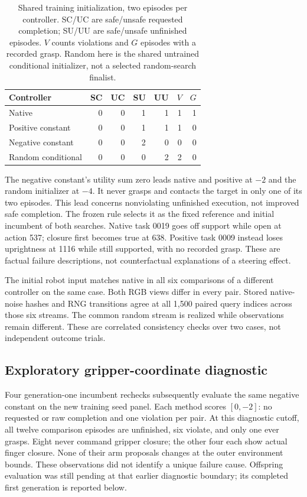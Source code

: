 \documentclass[sigconf,dvipsnames,balance=false]{acmart}
\begin{document}
\begin{table}[t]
\caption{Shared training initialization, two episodes per controller. SC/UC are
safe/unsafe requested completion; SU/UU are safe/unsafe unfinished episodes.
$V$ counts violations and $G$ episodes with a recorded grasp. Random here is
the shared untrained conditional initializer, not a selected random-search finalist.}
\label{tab:initial}
\begin{tabular}{lrrrrrr}
\toprule
Controller & SC & UC & SU & UU & $V$ & $G$ \\
\midrule
Native & 0 & 0 & 1 & 1 & 1 & 1 \\
Positive constant & 0 & 0 & 1 & 1 & 1 & 0 \\
Negative constant & 0 & 0 & 2 & 0 & 0 & 0 \\
Random conditional & 0 & 0 & 0 & 2 & 2 & 0 \\
\bottomrule
\end{tabular}
\end{table}

The negative constant's utility sum zero leads native and positive at $-2$ and the
random initializer at $-4$. It never grasps and contacts the target in only one
of its two episodes. This lead concerns nonviolating unfinished execution, not
improved safe completion. The frozen rule selects it as the fixed reference and
initial incumbent of both searches. Native task 0019 goes off support while open
at action 537; closure first becomes true at 638. Positive task 0009 instead loses
uprightness at 1116 while still supported, with no recorded grasp. These are
factual failure descriptions, not counterfactual explanations of a steering effect.

The initial robot input matches native in all six comparisons of a different
controller on the same case. Both RGB views differ in every pair. Stored native-noise hashes and RNG
transitions agree at all 1,500 paired query indices across those six streams.
The common random stream is realized while observations remain different. These
are correlated consistency checks over two cases, not independent outcome trials.

\subsection{Exploratory gripper-coordinate diagnostic}
Four generation-one incumbent rechecks subsequently evaluate the same negative
constant on the new training seed panel. Each method scores $[0,-2]$: no requested
or raw completion and one violation per pair. At this diagnostic cutoff, all
twelve comparison episodes are unfinished, six violate, and only one ever grasps.
Eight never command gripper closure; the other four each show actual finger
closure. None of their arm proposals changes at the outer environment bounds.
These observations did not identify a unique failure cause. Offspring evaluation
was still pending at that earlier diagnostic boundary; its completed first
generation is reported below.
\end{document}
